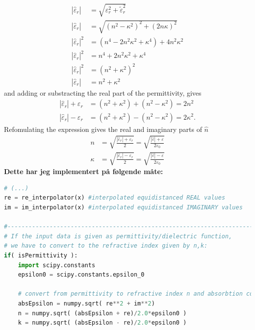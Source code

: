 \begin{enumerate}[label=\textbf{\arabic*})]
\begin{align}
         |\hat{\varepsilon}_r| &= \sqrt{ \varepsilon_r^2 + \tilde{\varepsilon}_r^2} \\
         |\hat{\varepsilon}_r| &= \sqrt{ (n^2 - \kappa^2)^2 + (2n\kappa)^2} \\
         |\hat{\varepsilon}_r|^2 &= (n^4 - 2n^2\kappa^2 + \kappa^4) + 4n^2\kappa^2 \\
         |\hat{\varepsilon}_r|^2 &= n^4 + 2n^2\kappa^2 + \kappa^4 \\
         |\hat{\varepsilon}_r|^2 &= (n^2 + \kappa^2)^2 \\
         |\hat{\varepsilon}_r| &= n^2 + \kappa^2 
      \end{align}
      and adding or substracting the real part of the permittivity, gives
      \begin{align}
         |\hat{\varepsilon}_r| + \varepsilon_r &= (n^2 + \kappa^2) + (n^2 - \kappa^2) = 2n^2\\
         |\hat{\varepsilon}_r| - \varepsilon_r &= (n^2 + \kappa^2) - (n^2 - \kappa^2) = 2\kappa^2.
      \end{align}
      Refomulating the expression gives the real and imaginary parts of $\hat{n}$
      \begin{align}
         n      &= \sqrt{ \frac{|\hat{\varepsilon}_r| + \varepsilon_r}{2}} 
                 = \sqrt{ \frac{|\hat{\varepsilon}| + \varepsilon}{2\varepsilon_0}}\\
         \kappa &= \sqrt{ \frac{|\hat{\varepsilon}_r| - \varepsilon_r}{2}} 
                 = \sqrt{ \frac{|\hat{\varepsilon}| - \varepsilon}{2\varepsilon_0}}
      \end{align}
      \textbf{Dette har jeg implementert på følgende måte:} 
      \begin{lstlisting}[style=FormattedNumber, language=python]
# (...)
re = re_interpolator(x) #interpolated equidistanced REAL values
im = im_interpolator(x) #interpolated equidistanced IMAGINARY values

#---------------------------------------------------------------------------------
# If the input data is given as permittivity/dielectric function, 
# we have to convert to the refractive index given by n,k:
if( isPermittivity ):
    import scipy.constants
    epsilon0 = scipy.constants.epsilon_0 

    # convert from permittivity to refractive index n and absorbtion coeff k:
    absEpsilon = numpy.sqrt( re**2 + im**2)
    n = numpy.sqrt( (absEpsilon + re)/2.0*epsilon0 )
    k = numpy.sqrt( (absEpsilon - re)/2.0*epsilon0 )


\end{lstlisting}
\end{enumerate}
